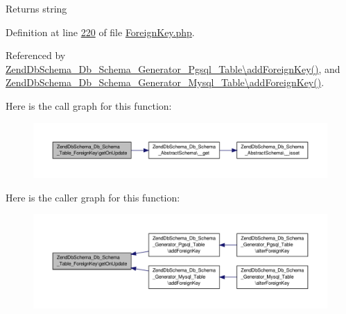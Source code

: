 \begin{DoxyReturn}{Returns}
string 
\end{DoxyReturn}


Definition at line \hyperlink{ForeignKey_8php_source_l00220}{220} of file \hyperlink{ForeignKey_8php_source}{Foreign\-Key.\-php}.



Referenced by \hyperlink{Generator_2Pgsql_2Table_8php_source_l00301}{Zend\-Db\-Schema\-\_\-\-Db\-\_\-\-Schema\-\_\-\-Generator\-\_\-\-Pgsql\-\_\-\-Table\textbackslash{}add\-Foreign\-Key()}, and \hyperlink{Generator_2Mysql_2Table_8php_source_l00324}{Zend\-Db\-Schema\-\_\-\-Db\-\_\-\-Schema\-\_\-\-Generator\-\_\-\-Mysql\-\_\-\-Table\textbackslash{}add\-Foreign\-Key()}.



Here is the call graph for this function\-:\nopagebreak
\begin{figure}[H]
\begin{center}
\leavevmode
\includegraphics[width=350pt]{classZendDbSchema__Db__Schema__Table__ForeignKey_afb55f45baab8357ce8c295e4d71bf700_cgraph}
\end{center}
\end{figure}




Here is the caller graph for this function\-:\nopagebreak
\begin{figure}[H]
\begin{center}
\leavevmode
\includegraphics[width=350pt]{classZendDbSchema__Db__Schema__Table__ForeignKey_afb55f45baab8357ce8c295e4d71bf700_icgraph}
\end{center}
\end{figure}


